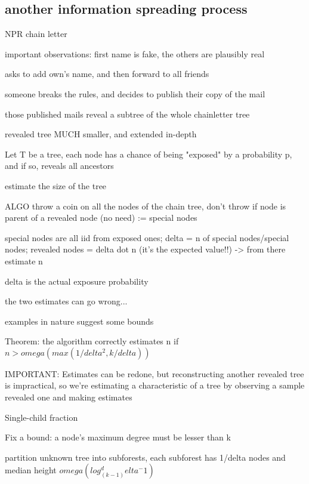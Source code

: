 \documentclass{report}
\begin{document}
	
	\subsection{another information spreading process}
	
	NPR chain letter
	
	important observations: first name is fake, the others are plausibly real
	
	asks to add own's name, and then forward to all friends
	
	
	someone breaks the rules, and decides to publish their copy of the mail
	
	those published mails reveal a subtree of the whole chainletter tree
	
	revealed tree MUCH smaller, and extended in-depth
	
	
	Let T be a tree, each node has a chance of being "exposed" by a probability p, and if so, reveals all ancestors
	
	estimate the size of the tree
	
	ALGO
	throw a coin on all the nodes of the chain tree, don't throw if node is parent of a revealed node (no need) := special nodes
	
	special nodes are all iid from exposed ones; delta = n of special nodes/special nodes; revealed nodes = delta dot n (it's the expected value!!) -> from there estimate n
	
	delta is the actual exposure probability
	
	the two estimates can go wrong...
	
	examples in nature suggest some bounds
	
	
	Theorem: the algorithm correctly estimates n if $n > omega(max(1/delta^2, k/delta))$
	
		
		IMPORTANT: Estimates can be redone, but reconstructing another revealed tree is impractical, so we're estimating a characteristic of  a tree by observing a sample revealed one and making estimates
	
	Single-child fraction
	
	Fix a bound: a node's maximum degree must be lesser than k
	
	partition unknown tree into subforests, each subforest has 1/delta nodes and median height $omega(log_(k-1)^delta^-1)$
	
\end{document}
